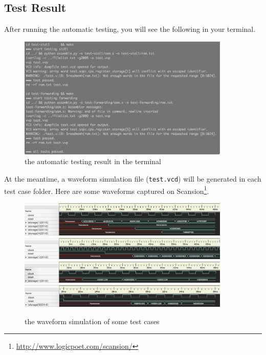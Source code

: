 \documentclass{article}
\begin{document}
\subsection{Test Result}
After running the automatic testing, you will see the following in your terminal.
\begin{figure}[!h]
\begin{center}
\includegraphics[width=0.9\textwidth]{image/terminal}
\caption{the automatic testing result in the terminal}
\end{center}
\end{figure}

At the meantime, a waveform simulation file (\texttt{test.vcd}) will be generated in each test case folder. Here are some waveforms captured on Scansion\footnote{\url{http://www.logicpoet.com/scansion/}}.
\begin{figure}[!h]
\begin{center}
\includegraphics[width=0.9\textwidth]{image/test-logic}
\includegraphics[width=0.9\textwidth]{image/test-jump}
\includegraphics[width=0.9\textwidth]{image/test-stall}
\includegraphics[width=0.9\textwidth]{image/test-forwarding}
\caption{the waveform simulation of some test cases}
\end{center}
\end{figure}
\end{document}
